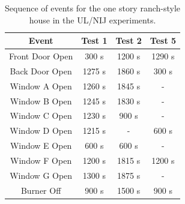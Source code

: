 \begin{table}[ht!]
\begin{center}
\begin{tabular}{|c||c|c|c|}
\hline
Event 			& Test 1  	& Test 2 	& Test 5 	\\ \hline \hline
Front Door Open & 300 s 	& 1200 s 	& 1290 s 	\\ \hline
Back Door Open  & 1275 s 	& 1860 s 	& 300 s 	\\ \hline
Window A Open  	& 1260 s 	& 1845 s 	& - 		\\ \hline
Window B Open  	& 1245 s 	& 1830 s 	& - 		\\ \hline
Window C Open  	& 1230 s 	& 900 s 	& - 		\\ \hline
Window D Open  	& 1215 s 	& - 		& 600 s 	\\ \hline
Window E Open  	& 600 s 	& 600 s 	& - 		\\ \hline
Window F Open  	& 1200 s 	& 1815 s 	& 1200 s 	\\ \hline
Window G Open  	& 1300 s 	& 1875 s 	& - 		\\ \hline
Burner Off 		& 900 s 	& 1500 s 	& 900 s 	\\ \hline
\end{tabular}
\end{center}
\caption[Sequence of events for the one story ranch-style house in the UL/NIJ experiments]
{Sequence of events for the one story ranch-style house in the UL/NIJ experiments.}
\label{Ranch_events}
\end{table}

